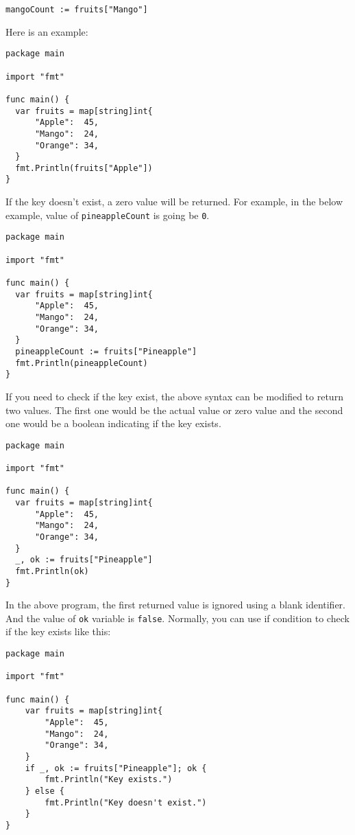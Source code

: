 \begin{lstlisting}[numbers=none]
mangoCount := fruits["Mango"]
\end{lstlisting}

Here is an example:

\begin{lstlisting}[numbers=none]
package main

import "fmt"

func main() {
  var fruits = map[string]int{
      "Apple":  45,
      "Mango":  24,
      "Orange": 34,
  }
  fmt.Println(fruits["Apple"])
}
\end{lstlisting}

If the key doesn't exist, a zero value will be returned. For example, in the
below example, value of \texttt{pineappleCount} is going be \texttt{0}.

\begin{lstlisting}[numbers=none]
package main

import "fmt"

func main() {
  var fruits = map[string]int{
      "Apple":  45,
      "Mango":  24,
      "Orange": 34,
  }
  pineappleCount := fruits["Pineapple"]
  fmt.Println(pineappleCount)
}
\end{lstlisting}

If you need to check if the key exist, the above syntax can be modified to
return two values. The first one would be the actual value or zero value and the
second one would be a boolean indicating if the key exists.

\begin{lstlisting}[numbers=none]
package main

import "fmt"

func main() {
  var fruits = map[string]int{
      "Apple":  45,
      "Mango":  24,
      "Orange": 34,
  }
  _, ok := fruits["Pineapple"]
  fmt.Println(ok)
}
\end{lstlisting}

In the above program, the first returned value is ignored using a blank
identifier. And the value of \texttt{ok} variable is \texttt{false}. Normally,
you can use if condition to check if the key exists like this:

\begin{lstlisting}[numbers=none]
package main

import "fmt"

func main() {
	var fruits = map[string]int{
		"Apple":  45,
		"Mango":  24,
		"Orange": 34,
	}
	if _, ok := fruits["Pineapple"]; ok {
		fmt.Println("Key exists.")
	} else {
		fmt.Println("Key doesn't exist.")
	}
}
\end{lstlisting}

